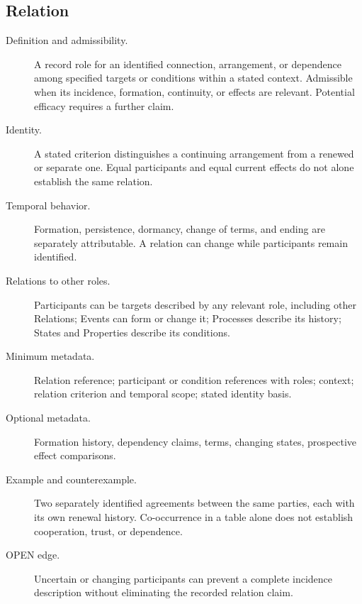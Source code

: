 \documentclass[11pt,a4paper]{article}
\begin{document}
\subsection{Relation}
\begin{description}
\item[Definition and admissibility.] A record role for an identified connection, arrangement, or dependence among specified targets or conditions within a stated context. Admissible when its incidence, formation, continuity, or effects are relevant. Potential efficacy requires a further claim.
\item[Identity.] A stated criterion distinguishes a continuing arrangement from a renewed or separate one. Equal participants and equal current effects do not alone establish the same relation.
\item[Temporal behavior.] Formation, persistence, dormancy, change of terms, and ending are separately attributable. A relation can change while participants remain identified.
\item[Relations to other roles.] Participants can be targets described by any relevant role, including other Relations; Events can form or change it; Processes describe its history; States and Properties describe its conditions.
\item[Minimum metadata.] Relation reference; participant or condition references with roles; context; relation criterion and temporal scope; stated identity basis.
\item[Optional metadata.] Formation history, dependency claims, terms, changing states, prospective effect comparisons.
\item[Example and counterexample.] Two separately identified agreements between the same parties, each with its own renewal history. Co-occurrence in a table alone does not establish cooperation, trust, or dependence.
\item[OPEN edge.] Uncertain or changing participants can prevent a complete incidence description without eliminating the recorded relation claim.
\end{description}
\end{document}
